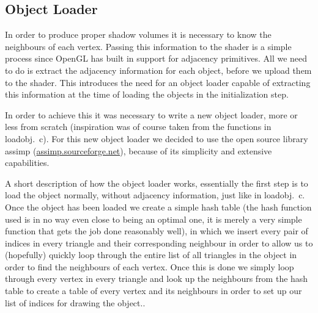 \documentclass[a4paper, 12pt]{article}
\begin{document}
\subsection{Object Loader}
In order to produce proper shadow volumes it is necessary to know the neighbours
of each vertex. Passing this information to the shader is a simple process since
OpenGL has built in support for adjacency primitives. All we need to do is
extract the adjacency information for each object, before we upload them to the
shader. This introduces the need for an object loader capable of extracting this
information at the time of loading the objects in the initialization step.

In order to achieve this it was necessary to write a new object loader, more or
less from scratch (inspiration was of course taken from the functions in
loadobj.~c). For this new object loader we decided to use the open source library
assimp (\url{assimp.sourceforge.net}), because of its simplicity and extensive
capabilities.

A short description of how the object loader works, essentially the first step
is to load the object normally, without adjacency information, just like in
loadobj.~c. Once the object has been loaded we create a simple hash table (the
hash function used is in no way even close to being an optimal one, it is merely
a very simple function that gets the job done reasonably well), in which we
insert every pair of indices in every triangle and their corresponding neighbour
in order to allow us to (hopefully) quickly loop through the entire list of all
triangles in the object in order to find the neighbours of each vertex. Once
this is done we simply loop through every vertex in every triangle and look up
the neighbours from the hash table to create a table of every vertex and its
neighbours in order to set up our list of indices for drawing the object..
\end{document}
